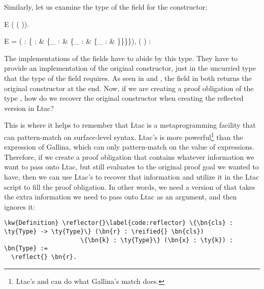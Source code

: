\newpage
Similarly, let us examine the type of the \ctorreflected{} field for the  constructor:


\vspace{.2in}
\begin{SaveVerbatim}{E}
 ( (\ctorreified{} \consdesc{})).
\end{SaveVerbatim}

\begin{SaveVerbatim}{E}
= 
    ( : \{ :  \& \{_ : \ctorann{}  \& \{_ :  \& \{_ :   \& \}\}\}\}),
     ( )
: 
\end{SaveVerbatim}

The implementations of the \ctorreflected{} fields have to abide by this type. They have to provide an implementation of the original constructor, just in the uncurried type that the type of the field requires. As seen in \nildesc{} and \ctordesc{}, the \ctorreflected{} field in both returns the original constructor at the end. Now, if we are creating a proof obligation of the type , how do we recover the original constructor when creating the reflected version in \gls{Ltac}?

This is where it helps to remember that \gls{Ltac} is a \gls{metaprogramming} facility that can pattern-match on surface-level syntax. \gls{Ltac}'s  is more powerful\footnote{\gls{Ltac}'s  and  can do what \gls{Gallina}'s match does.} than the  expression of \gls{Gallina}, which can only pattern-match on the value of expressions. Therefore, if we create a proof obligation that contains whatever information we want to pass onto \gls{Ltac}, but still evaluates to the original proof goal we wanted to have, then we can use \gls{Ltac}'s  to recover that information and utilize it in the \gls{Ltac} script to fill the proof obligation. In other words, we need a version of  that takes the extra information we need to pass onto \gls{Ltac} as an argument, and then ignores it:

\newcommand{\reflector}{\hyperref[code:reflector]{\fn{reflector}}}
\begin{Verbatim}
\kw{Definition} \reflector{}\label{code:reflector} \{\bn{cls} : \ty{Type} -> \ty{Type}\} (\bn{r} : \reified{} \bn{cls})
                     \{\bn{k} : \ty{Type}\} (\bn{x} : \ty{k}) : \bn{Type} :=
  \reflect{} \bn{r}.
\end{Verbatim}

